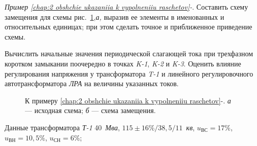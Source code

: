 \begin{small} %
	
	\vspace{1pc}
	\textit{Пример \ref*{chap:2 obshchie ukazaniia k vypolneniiu raschetov}-}.
	Составить схему замещения для схемы рис.~\ref{ris:2-3 k_primeru},\textit{а,} выразив ее элементы в именованных и относительных единицах;	при этом сделать точное и приближенное приведение схемы.
	
	Вычислить начальные значения периодической слагающей тока при трехфазном коротком замыкании поочередно в точках \textit{K-1}, \textit{K-2} и \textit{K-3}.	Оценить влияние регулирования напряжения у трансформатора \textit{T-1} и линейного регулировочного автотрансформатора \textit{ЛРА} на величины указанных токов.
	
	\begin{figure}
		\begin{minipage}[h]{1\linewidth}
		\end{minipage}
		\vfill
		\begin{minipage}[h]{1\linewidth}
		\end{minipage}
		\caption{К примеру \ref*{chap:2 obshchie ukazaniia k vypolneniiu raschetov}-. \textit{а} --- исходная схема; \textit{б} --- схема замещения.}
		\label{ris:2-3 k_primeru}
	\end{figure}
	
	Данные трансформатора \textit{Т-1} 40~\textit{Мва}, $ 115\pm16\% / 38,5 / 11$~\textit{кв}, $ u_{\text{ВС}} = 17\% $, $ u_{\text{ВН}} = 10,5\% $, $ u_{\text{СН}} = 6\% $;
	

\end{small}
